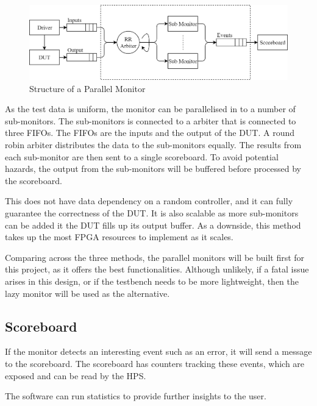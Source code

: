 \begin{figure}[H]
  \centering
  \includegraphics[width=15cm]{img/ParMon}
  \caption{Structure of a Parallel Monitor}
  \label{ParMon}
\end{figure}

As the test data is uniform, the monitor can be parallelised in to a number of
sub-monitors.
The sub-monitors is connected to a arbiter that is connected to three FIFOs.
The FIFOs are the inputs and the output of the DUT.
A round robin arbiter distributes the data to the sub-monitors equally.
The results from each sub-monitor are then sent to a single scoreboard.
To avoid potential hazards, the output from the sub-monitors will be buffered
before processed by the scoreboard.

This does not have data dependency on a random controller, and it can
fully guarantee the correctness of the DUT.
It is also scalable as more sub-monitors can be added it the DUT fills up its
output buffer.
As a downside, this method takes up the most FPGA resources to implement as it
scales.

Comparing across the three methods, the parallel monitors will be built first
for this project, as it offers the best functionalities.
Although unlikely, if a fatal issue arises in this design, or if the testbench
needs to be more lightweight, then the lazy monitor will be used as the
alternative.

\subsection{Scoreboard}

If the monitor detects an interesting event such as an error, it will send
a message to the scoreboard.
The scoreboard has counters tracking these events, which are exposed and can be
read by the HPS.

The software can run statistics to provide further insights to the user.
